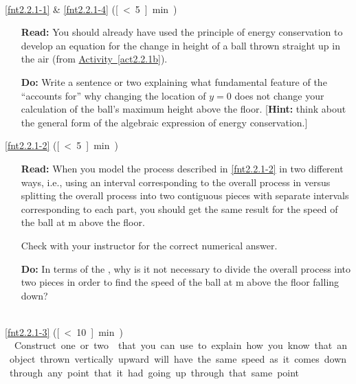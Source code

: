 \noindent{}\\

\noindent\ref{fnt2.2.1-1} \& \ref{fnt2.2.1-4} (\unit[\textless 5]{min}) 
 
 \begin{itemize}
 	\item[\textbf{Read:}] You should already have used the principle of energy conservation to develop an equation for the change in height of a ball thrown straight up in the air (from \hyperref[act2.2.1b]{Activity~\ref{act2.2.1b}}).
	
	\item[\textbf{Do:}] Write a sentence or two explaining what fundamental feature of the \EnergyInteractionModel{} ``accounts for'' why changing the location of $y = 0$ does not change your calculation of the ball's maximum height above the floor. [\textbf{Hint:} think about the general form of the algebraic expression of energy conservation.]
\end{itemize}

\noindent
\ref{fnt2.2.1-2} (\unit[\textless 5]{min})

\begin{itemize}
	\item[\textbf{Read:}] When you model the process described in \ref{fnt2.2.1-2} in two different ways, i.e., using an interval corresponding to the overall process in versus splitting the overall process into two contiguous pieces with separate intervals corresponding to each part, you should get the same result for the speed of the ball at \unit[4]{m} above the floor.
	
	Check with your instructor for the correct numerical answer.
	
	\item[\textbf{Do:}] In terms of the \EnergyInteractionModel{}, why is it not necessary to divide the overall process into two pieces in order to find the speed of the ball at \unit[4]{m} above the floor falling down? 		 
\end{itemize}


\noindent{}\\

\noindent\ref{fnt2.2.1-3} (\unit[\textless 10]{min})\\

\noindent Construct one or two \EnergyDiagrams{} that you can use to explain how you know that an object thrown vertically upward will have the same speed as it comes down through any point that it had going up through that same point.\\


